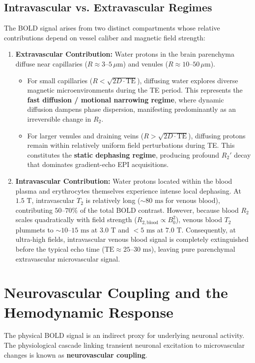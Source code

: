 \documentclass[11pt,a4paper]{article}
\begin{document}
\subsection{Intravascular vs. Extravascular Regimes}
The BOLD signal arises from two distinct compartments whose relative contributions depend on vessel caliber and magnetic field strength:
\begin{enumerate}[leftmargin=2em]
    \item \textbf{Extravascular Contribution:} Water protons in the brain parenchyma diffuse near capillaries ($R \approx 3\text{--}5\,\mu\text{m}$) and venules ($R \approx 10\text{--}50\,\mu\text{m}$). 
    \begin{itemize}
        \item For small capillaries ($R < \sqrt{2 D \cdot \text{TE}}$), diffusing water explores diverse magnetic microenvironments during the TE period. This represents the \textbf{fast diffusion / motional narrowing regime}, where dynamic diffusion dampens phase dispersion, manifesting predominantly as an irreversible change in $R_2$.
        \item For larger venules and draining veins ($R > \sqrt{2 D \cdot \text{TE}}$), diffusing protons remain within relatively uniform field perturbations during TE. This constitutes the \textbf{static dephasing regime}, producing profound $R_2'$ decay that dominates gradient-echo EPI acquisitions.
    \end{itemize}
    \item \textbf{Intravascular Contribution:} Water protons located within the blood plasma and erythrocytes themselves experience intense local dephasing. At $1.5\text{ T}$, intravascular $T_2$ is relatively long ($\sim 80\text{ ms}$ for venous blood), contributing $50\text{--}70\%$ of the total BOLD contrast. However, because blood $R_2$ scales quadratically with field strength ($R_{2,\text{blood}} \propto B_0^2$), venous blood $T_2$ plummets to $\sim 10\text{--}15\text{ ms}$ at $3.0\text{ T}$ and $< 5\text{ ms}$ at $7.0\text{ T}$. Consequently, at ultra-high fields, intravascular venous blood signal is completely extinguished before the typical echo time ($\text{TE} \approx 25\text{--}30\text{ ms}$), leaving pure parenchymal extravascular microvascular signal.
\end{enumerate}

\section{Neurovascular Coupling and the Hemodynamic Response}
The physical BOLD signal is an indirect proxy for underlying neuronal activity. The physiological cascade linking transient neuronal excitation to microvascular changes is known as \textbf{neurovascular coupling}.
\end{document}
